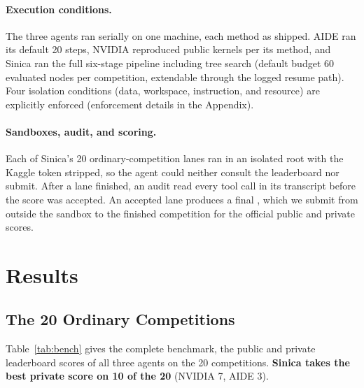 \documentclass[11pt,a4paper]{article}
\begin{document}
\paragraph{Execution conditions.} The three agents ran serially on one machine, each method as shipped. AIDE ran its default 20 steps, NVIDIA reproduced public kernels per its method, and Sinica ran the full six-stage pipeline including tree search (default budget 60 evaluated nodes per competition, extendable through the logged resume path). Four isolation conditions (data, workspace, instruction, and resource) are explicitly enforced (enforcement details in the Appendix).

\paragraph{Sandboxes, audit, and scoring.} Each of Sinica's 20 ordinary-competition lanes ran in an isolated root with the Kaggle token stripped, so the agent could neither consult the leaderboard nor submit. After a lane finished, an audit read every tool call in its transcript before the score was accepted. An accepted lane produces a final , which we submit from outside the sandbox to the finished competition for the official public and private scores.

\section{Results}
\label{sec:results}

\subsection{The 20 Ordinary Competitions}

Table~\ref{tab:bench} gives the complete benchmark, the public and private leaderboard scores of all three agents on the 20 competitions. \textbf{Sinica takes the best private score on 10 of the 20} (NVIDIA 7, AIDE 3).
\end{document}
